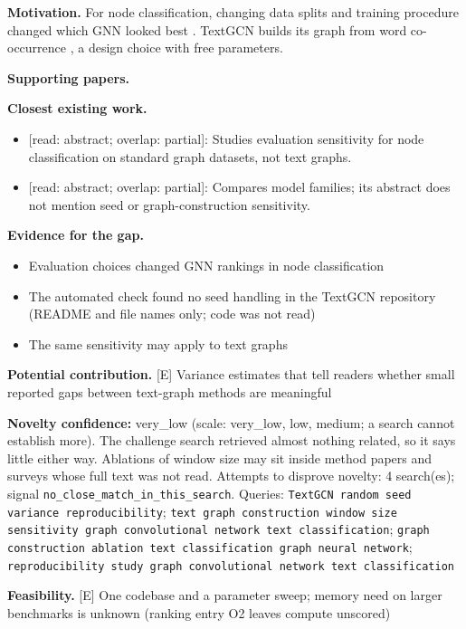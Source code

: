 \documentclass[11pt,a4paper]{article}
\begin{document}
\textbf{Motivation.} For node classification, changing data splits and training procedure changed which GNN looked best \cite{shchur2019}. TextGCN builds its graph from word co-occurrence \cite{yao2019}, a design choice with free parameters.

\textbf{Supporting papers.} \cite{shchur2019,yao2019}

\textbf{Closest existing work.}
\begin{itemize}
\item \cite{shchur2019} [read: abstract; overlap: partial]: Studies evaluation sensitivity for node classification on standard graph datasets, not text graphs.
\item \cite{galke2022} [read: abstract; overlap: partial]: Compares model families; its abstract does not mention seed or graph-construction sensitivity.
\end{itemize}

\textbf{Evidence for the gap.}
\begin{itemize}
\item [V] Evaluation choices changed GNN rankings in node classification \cite{shchur2019}
\item [V] The automated check found no seed handling in the TextGCN repository (README and file names only; code was not read)
\item [S] The same sensitivity may apply to text graphs
\end{itemize}

\textbf{Potential contribution.} [E] Variance estimates that tell readers whether small reported gaps between text-graph methods are meaningful

\textbf{Novelty confidence:} very\_low (scale: very\_low, low, medium; a search cannot establish more). The challenge search retrieved almost nothing related, so it says little either way. Ablations of window size may sit inside method papers and surveys \cite{wang2024} whose full text was not read.
Attempts to disprove novelty: 4 search(es); signal \texttt{no\_close\_match\_in\_this\_search}. Queries: \texttt{TextGCN random seed variance reproducibility}; \texttt{text graph construction window size sensitivity graph convolutional network text classification}; \texttt{graph construction ablation text classification graph neural network}; \texttt{reproducibility study graph convolutional network text classification}

\textbf{Feasibility.} [E] One codebase and a parameter sweep; memory need on larger benchmarks is unknown (ranking entry O2 leaves compute unscored)
\end{document}
